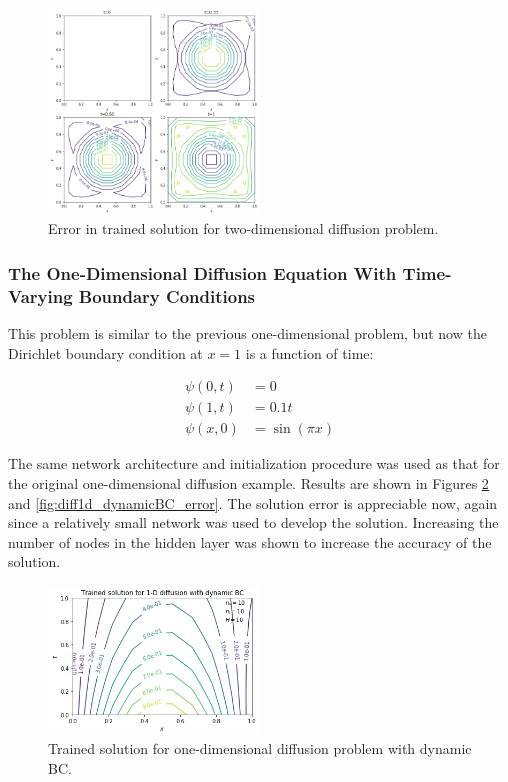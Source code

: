 \documentclass{article}
\begin{document}
\begin{figure}
\centering
\includegraphics[width=0.5\textwidth]{figures/diff2d_error.png}
\caption{Error in trained solution for two-dimensional diffusion problem.}
\label{fig:diff2d_error}
\end{figure}

\subsubsection{The One-Dimensional Diffusion Equation With Time-Varying Boundary Conditions}

This problem is similar to the previous one-dimensional problem, but now the Dirichlet boundary condition at $x=1$ is a function of time:

\begin{equation}
\begin{split}
  \psi(0,t) &= 0 \\
  \psi(1,t) &= 0.1 t\\
  \psi(x,0) &= \sin(\pi x)
\end{split}
\end{equation}


The same network architecture and initialization procedure was used as that for the original one-dimensional diffusion example. Results are shown in Figures \ref{fig:diff1d_dynamicBC_trained} and \ref{fig:diff1d_dynamicBC_error}. The solution error is appreciable now, again since a relatively small network was used to develop the solution. Increasing the number of nodes in the hidden layer was shown to increase the accuracy of the solution.

\begin{figure}
    \centering
    \includegraphics[width=0.5\textwidth]{figures/diff1d_dynamicBC_trained.png}
    \caption{Trained solution for one-dimensional diffusion problem with dynamic BC.}
    \label{fig:diff1d_dynamicBC_trained}
\end{figure}
\end{document}
